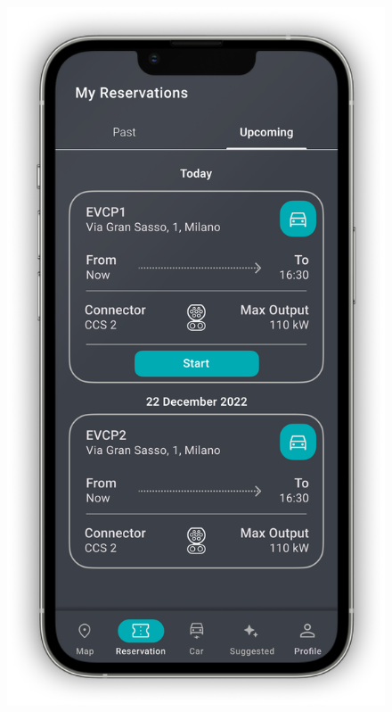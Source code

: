 \begin{figure}[H]
{        \includegraphics[scale=0.32]{src/mockups/reservations.png}
    }
    \subfloat[Suggestions]{
}
\end{figure}

